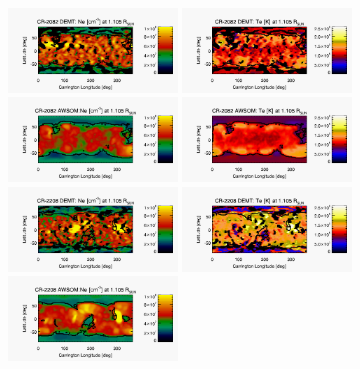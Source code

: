 \documentclass[baaa]{baaa}
\begin{document}
\begin{figure}
  \centering
  \includegraphics[width=0.4\textwidth,height=0.2\textwidth]{figuras/map_Ne_CR2082_DEMT-EUVI_behind_H1-L3523_r3d_1105_Rsun.jpg}
  \includegraphics[width=0.4\textwidth]{figuras/map_Tm_CR2082_DEMT-EUVI_behind_H1-L3523_r3d_1105_Rsun.jpg}
  \includegraphics[width=0.4\textwidth]{figuras/map_Ne_awsom_2082_185_short_1105_Rsun.jpg}
  \includegraphics[width=0.4\textwidth]{figuras/map_Te_awsom_2082_185_short_1105_Rsun.jpg}
  \includegraphics[width=0.4\textwidth]{figuras/map_Ne_CR2208_DEMT-AIA_H1_L522_r3d_1105_Rsun.jpg}
  \includegraphics[width=0.4\textwidth]{figuras/map_Tm_CR2208_DEMT-AIA_H1_L522_r3d_1105_Rsun.jpg}  
  \includegraphics[width=0.4\textwidth]{figuras/map_Ne_awsom_2208_185_short_1105_Rsun.jpg}

\end{figure}
\end{document}

